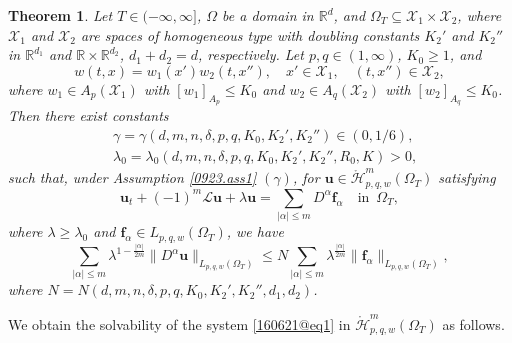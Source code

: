 \documentclass[reqno]{amsart}
\numberwithin{equation}{section}
\theoremstyle{plain}
\newtheorem{theorem}{Theorem}[section]
\theoremstyle{definition}
\theoremstyle{remark}
\begin{document}
\begin{theorem}		\label{1016@thm1}
Let $T\in (-\infty,\infty]$, $\Omega$  be a domain in ${\mathbb{R}}^d$, and $ \Omega_T\subseteq {\mathcal{X}}_1\times {\mathcal{X}}_2$, where ${\mathcal{X}}_1$ and ${\mathcal{X}}_2$ are  spaces of homogeneous type with  doubling constants $K_2'$ and $K_2''$ in ${\mathbb{R}}^{d_1}$ and ${\mathbb{R}}\times {\mathbb{R}}^{d_2}$, $d_1+d_2=d$, respectively.
Let $p,q\in (1,\infty)$, $K_0\ge 1$, and 
$$
w(t,x)=w_1(x')w_2(t,x''), \quad x'\in {\mathcal{X}}_1, \quad (t,x'')\in {\mathcal{X}}_2,
$$
where $w_1\in A_p({\mathcal{X}}_1)$ with $[w_1]_{A_p}\le K_0$ and $w_2\in A_q({\mathcal{X}}_2)$ with $[w_2]_{A_q}\le K_0$.
Then there exist constants
\begin{align*}
&\gamma=\gamma(d,m,n,\delta,p,q,K_0, K_2', K_2'')\in (0,1/6),\\
&\lambda_0=\lambda_0(d,m,n,\delta,p,q, K_0,K_2',K_2'',R_0,K)>0,
\end{align*}
such that, under Assumption \ref{0923.ass1} $(\gamma)$, for ${\boldsymbol{u}}\in \mathring{\mathcal{H}}^m_{p,q,w}(\Omega_T)$ satisfying 
\begin{equation}		\label{160621@eq1}
{\boldsymbol{u}}_t+(-1)^m{\mathcal{L}}{\boldsymbol{u}}+\lambda{\boldsymbol{u}}=\sum_{|\alpha| \le m}D^\alpha {\boldsymbol{f}}_\alpha \quad \text{in }\, \Omega_T, 
\end{equation}
where $\lambda\ge \lambda_0$ and ${\boldsymbol{f}}_\alpha\in L_{p,q,w}(\Omega_T)$, we have 
\begin{equation}		\label{1017@e4}
\sum_{|\alpha| \le m}\lambda^{1-\frac{|\alpha|}{2m}}\|D^\alpha {\boldsymbol{u}}\|_{L_{p,q,w}(\Omega_T)}\le N\sum_{|\alpha| \le m}\lambda^{\frac{|\alpha|}{2m}}\|{\boldsymbol{f}}_\alpha\|_{L_{p,q,w}(\Omega_T)},
\end{equation}
where $N=N(d,m,n,\delta,p,q,K_0, K_2', K_2'',d_1,d_2)$.
\end{theorem}

We obtain the solvability of the system \eqref{160621@eq1} in $\mathring{\mathcal{H}}^m_{p,q,w}(\Omega_T)$ as follows.
\end{document}
